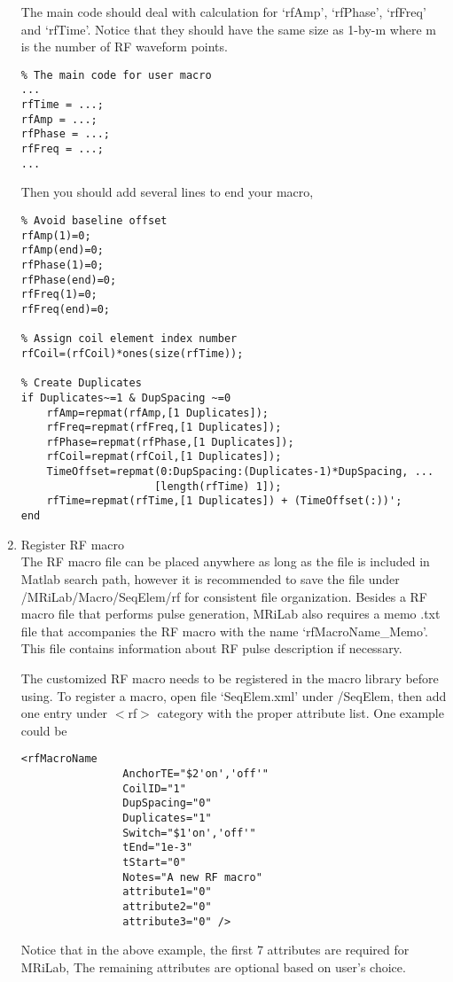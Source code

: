 \documentclass{book}%
\begin{document}
\begin{enumerate}
The main code should deal with calculation for `rfAmp', `rfPhase', `rfFreq' and `rfTime'. Notice that they should have the same size as 1-by-m where m is the number of RF waveform points.

\begin{verbatim}
% The main code for user macro
...
rfTime = ...;
rfAmp = ...;
rfPhase = ...;
rfFreq = ...;
...
\end{verbatim}


Then you should add several lines to end your macro,

\begin{verbatim}
% Avoid baseline offset
rfAmp(1)=0;
rfAmp(end)=0;
rfPhase(1)=0;
rfPhase(end)=0;
rfFreq(1)=0;
rfFreq(end)=0;

% Assign coil element index number
rfCoil=(rfCoil)*ones(size(rfTime));

% Create Duplicates
if Duplicates~=1 & DupSpacing ~=0
    rfAmp=repmat(rfAmp,[1 Duplicates]);
    rfFreq=repmat(rfFreq,[1 Duplicates]);
    rfPhase=repmat(rfPhase,[1 Duplicates]);
    rfCoil=repmat(rfCoil,[1 Duplicates]);
    TimeOffset=repmat(0:DupSpacing:(Duplicates-1)*DupSpacing, ... 
                     [length(rfTime) 1]);
    rfTime=repmat(rfTime,[1 Duplicates]) + (TimeOffset(:))';
end

\end{verbatim}

\item Register RF macro \\

The RF macro file can be placed anywhere as long as the file is included in Matlab search path, however it is recommended to save the file under /MRiLab/Macro/SeqElem/rf for consistent file organization. Besides a RF macro file that performs pulse generation, MRiLab also requires a memo .txt file that accompanies the RF macro with the name `rfMacroName\_Memo'. This file contains information about RF pulse description if necessary.

The customized RF macro needs to be registered in the macro library before using. To register a macro, open file `SeqElem.xml' under /SeqElem, then add one entry under $<$rf$>$ category with the proper attribute list. One example could be

\begin{verbatim}
<rfMacroName 
				AnchorTE="$2'on','off'" 
				CoilID="1" 
				DupSpacing="0" 
				Duplicates="1" 
				Switch="$1'on','off'" 
				tEnd="1e-3" 
				tStart="0" 
				Notes="A new RF macro" 
				attribute1="0" 
				attribute2="0" 
				attribute3="0" />
\end{verbatim}

Notice that in the above example, the first 7 attributes are required for MRiLab, The remaining attributes are optional based on user's choice.

\end{enumerate}
\end{document}
